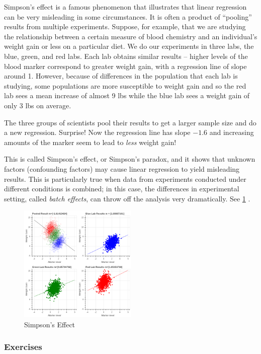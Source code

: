 \documentclass[
]{article}
\begin{document}
Simpson's effect is a famous phenomenon that illustrates that linear
regression can be very misleading in some circumstances. It is often a
product of ``pooling'' results from multiple experiments. Suppose, for
example, that we are studying the relationship between a certain measure
of blood chemistry and an individual's weight gain or less on a
particular diet. We do our experiments in three labs, the blue, green,
and red labs. Each lab obtains similar results -- higher levels of the
blood marker correspond to greater weight gain, with a regression line
of slope around 1. However, because of differences in the population
that each lab is studying, some populations are more susceptible to
weight gain and so the red lab sees a mean increase of almost 9 lbs
while the blue lab sees a weight gain of only 3 lbs on average.

The three groups of scientists pool their results to get a larger sample
size and do a new regression. Surprise! Now the regression line has
slope \(-1.6\) and increasing amounts of the marker seem to lead to
\emph{less} weight gain!

This is called Simpson's effect, or Simpson's paradox, and it shows that
unknown factors (confounding factors) may cause linear regression to
yield misleading results. This is particularly true when data from
experiments conducted under different conditions is combined; in this
case, the differences in experimental setting, called \emph{batch
effects}, can throw off the analysis very dramatically. See
\cref{fig:simpsons} .

\begin{figure}
\hypertarget{fig:simpsons}{%
\centering
\includegraphics[width=0.5\textwidth,height=\textheight]{../img/SimpsonsEffect.png}
\caption{Simpson's Effect}\label{fig:simpsons}
}
\end{figure}

\hypertarget{exercises-1}{%
\subsubsection{Exercises}\label{exercises-1}}
\end{document}
